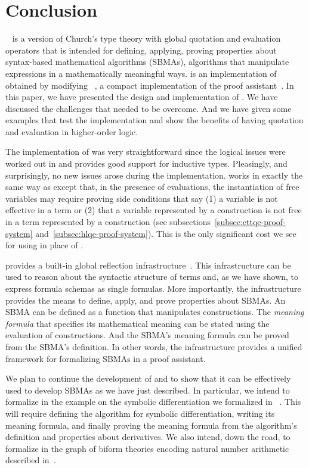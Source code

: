 \documentclass[fleqn]{llncs}
\begin{document}
\section{Conclusion}\label{sec:conclusion}

{\churchqe}~\cite{Farmer16,Farmer18} is a version of Church's
type theory with global quotation and evaluation operators that is
intended for defining, applying, proving properties about syntax-based
mathematical algorithms (SBMAs), algorithms that manipulate
expressions in a mathematically meaningful ways.  {\HLQE} is an
implementation of {\churchqe} obtained by modifying
{\HL}~\cite{Harrison09}, a compact implementation of the {\HOL} proof
assistant~\cite{GordonMelham93}.  In this paper, we have presented the
design and implementation of {\HLQE}.  We have discussed the
challenges that needed to be overcome.  And we have given some
examples that test the implementation and show the benefits of having
quotation and evaluation in higher-order logic.

The implementation of {\HLQE} was very straightforward since the
logical issues were worked out in {\churchqe} and {\HL} provides good
support for inductive types.  Pleasingly, and surprisingly, no new
issues arose during the implementation. {\HLQE} works in exactly the
same way as {\HL} except that, in the presence of evaluations, the 
instantiation of free variables may require proving side conditions 
that say (1) a variable is not effective in a term or (2) that a variable
represented by a construction is not free in a term represented by a
construction (see subsections~\ref{subsec:cttqe-proof-system}
and~\ref{subsec:hlqe-proof-system}).  This is the only significant
cost we see for using {\HLQE} in place of {\HL}.

{\HLQE} provides a built-in global reflection
infrastructure~\cite{Farmer18}.  This infrastructure can be used
to reason about the syntactic structure of terms and, as we have
shown, to express formula schemas as single formulas.  More
importantly, the infrastructure provides the means to define, apply,
and prove properties about SBMAs.  An SBMA can be defined as a
function that manipulates constructions.  The \emph{meaning formula}
that specifies its mathematical meaning can be stated using the
evaluation of constructions.  And the SBMA's meaning formula can be
proved from the SBMA's definition. In other words, the infrastructure
provides a unified framework for formalizing SBMAs in a proof
assistant.

We plan to continue the development of {\HLQE} and to show that it can
be effectively used to develop SBMAs as we have just described.  In
particular, we intend to formalize in {\HLQE} the example on the
symbolic differentiation we formalized in {\churchqe}~\cite{Farmer18}.
This will require defining the algorithm for symbolic differentiation,
writing its meaning formula, and finally proving the meaning formula
from the algorithm's definition and properties about derivatives.  We
also intend, down the road, to formalize in {\HLQE} the graph of
biform theories encoding natural number arithmetic described
in~\cite{CaretteFarmer17}.
\end{document}
